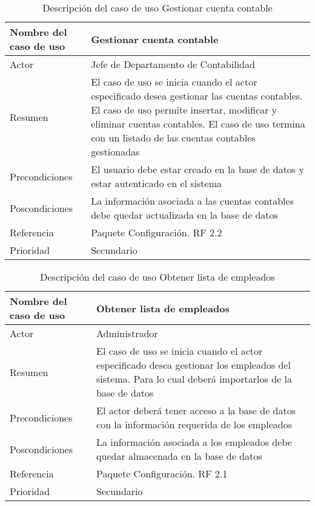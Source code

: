 \begin{table}[H]
	\sf
	\begin{supertabular}{|p{4.5cm}|p{12cm}|}
		\hline
		\textbf{Nombre del caso de uso}
		& \textbf{Gestionar cuenta contable} \\ \hline
		
		Actor
		& Jefe de Departamento de Contabilidad \\ \hline
		
		Resumen
		& El caso de uso se inicia cuando el actor especificado desea gestionar las cuentas contables. El caso de uso permite insertar, modificar y eliminar cuentas contables. El caso de uso termina con un listado de las cuentas contables gestionadas \\ \hline
		
		Precondiciones
		& El usuario debe estar creado en la base de datos y estar autenticado en el sistema \\ \hline
		
		Poscondiciones
		& La información asociada a las cuentas contables debe quedar actualizada en la base de datos \\ \hline
		
		Referencia
		& Paquete Configuración. RF 2.2 \\ \hline
		
		Prioridad
		& Secundario \\		
		\hline
	\end{supertabular}
	\caption[Descripción del caso de uso Gestionar cuenta contable]{Descripción del caso de uso Gestionar cuenta contable}
	\label{table:CU_GestCCont}
\end{table}

\begin{table}[H]
	\sf
	\begin{supertabular}{|p{4.5cm}|p{12cm}|}
		\hline
		\textbf{Nombre del caso de uso}
		& \textbf{Obtener lista de empleados} \\ \hline
		
		Actor
		& Administrador \\ \hline
		
		Resumen
		& El caso de uso se inicia cuando el actor especificado desea gestionar los empleados del sistema. Para lo cual deberá importarlos de la base de datos  \\ \hline
		
		Precondiciones
		& El actor deberá tener acceso a la base de datos con la información requerida de los empleados \\ \hline
		
		Poscondiciones
		& La información asociada a los empleados debe quedar almacenada en la base de datos \\ \hline
		
		Referencia
		& Paquete Configuración. RF 2.1 \\ \hline
		
		Prioridad
		& Secundario \\		
		\hline
	\end{supertabular}
	\caption[Descripción del caso de uso Obtener lista de empleados]{Descripción del caso de uso Obtener lista de empleados}
	\label{table:CU_GetEList}
\end{table}

